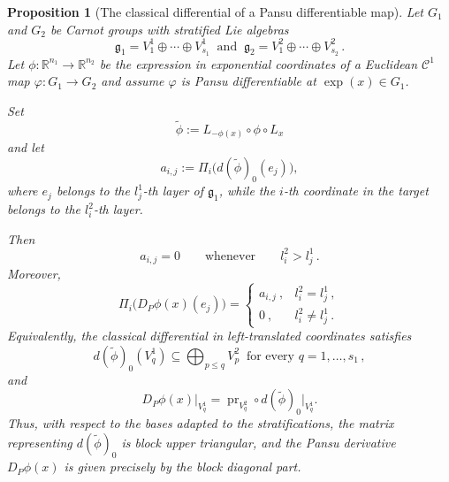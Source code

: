 \documentclass[10pt,a4paper]{amsart}
\newtheorem{proposition}{Proposition}
\begin{document}
\begin{proposition}[The classical differential of a Pansu differentiable map]
\label{prop:triangularity-classical-differential}
Let \(G_1\) and \(G_2\) be Carnot groups with stratified Lie algebras
\[
\mathfrak g_1=V_1^1\oplus\cdots\oplus V_{s_1}^1
\ \text{ and }\ 
\mathfrak g_2=V_1^2\oplus\cdots\oplus V_{s_2}^2\,.
\]
Let $\phi\colon\mathbb R^{n_1}\longrightarrow\mathbb R^{n_2}$
be the expression in exponential coordinates of a Euclidean
\(\mathcal C^1\) map
\(\varphi:G_1\to G_2\) and assume \(\varphi\) is Pansu
differentiable at $\exp(x)\in G_1$.

Set
\[
\widetilde\phi
:=
L_{-\phi(x)}\circ\phi\circ L_x
\]
and let
\[
a_{i,j}
:=
\Pi_i\bigl(d(\widetilde\phi)_0(e_j)\bigr),
\]
where \(e_j\) belongs to the $l_j^1$-th layer of $\mathfrak{g}_1$, while
the \(i\)-th coordinate in the target belongs to the $l_i^2$-th layer.

Then
\[
a_{i,j}=0
\qquad\text{whenever}\qquad
l_i^2>l_j^1\,.
\]
Moreover,
\[
\Pi_i\bigl(D_P\phi(x)(e_j)\bigr)
=
\begin{cases}
a_{i,j}\ , & l_i^2=l_j^1\,,\\[2mm]
0\ ,       & l_i^2\neq l_j^1\,.
\end{cases}
\]
Equivalently, the classical differential in left-translated
coordinates satisfies
\[
d(\widetilde\phi)_0(V_q^1)
\subseteq
\bigoplus_{p\leq q}V_p^2\ \text{ for every }q=1,\ldots,s_1\,,
\] and
\[
D_P\phi(x)\big|_{V_q^1}
=
\operatorname{pr}_{V_q^2}
\circ d(\widetilde\phi)_0\big|_{V_q^1}.
\]
Thus, with respect to the bases adapted to the stratifications,
the matrix representing \(d(\widetilde\phi)_0\) is block upper
triangular, and the Pansu derivative \(D_P\phi(x)\) is given
precisely by the block diagonal part.
\end{proposition}
\end{document}
